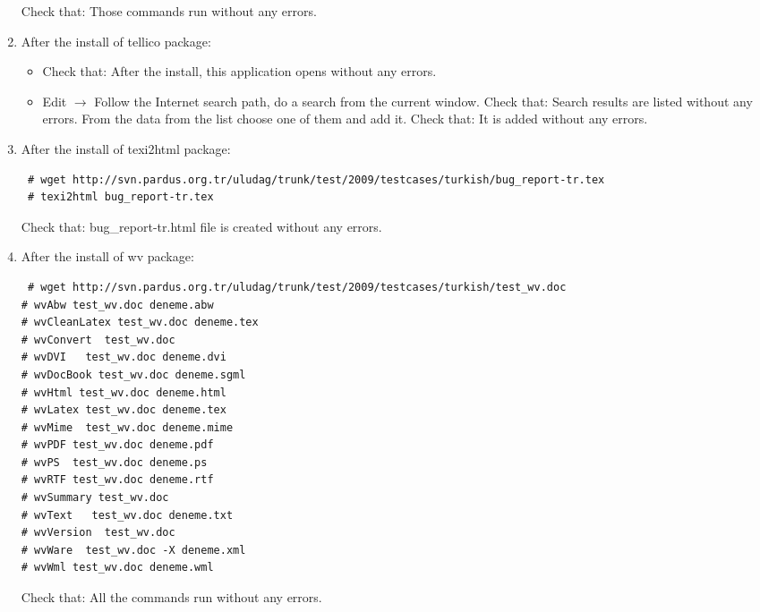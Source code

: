 \documentclass[a4paper,10pt]{article}
\begin{document}
\begin{enumerate}
Check that: Those commands run without any errors. 
\item After the install of tellico package:


\begin{itemize}
 \item Check that: After the install, this application opens without any errors.
 \item Edit $\rightarrow$ Follow the Internet search path, do a search from the current window. Check that: Search results are listed without any errors. From the data from the list choose one of them and add it. Check that: It is added without any errors.
\end{itemize}

\item After the install of  texi2html package:
\begin{verbatim}
 # wget http://svn.pardus.org.tr/uludag/trunk/test/2009/testcases/turkish/bug_report-tr.tex
 # texi2html bug_report-tr.tex
\end{verbatim}

Check that: bug\_report-tr.html file is created without any errors.

\item After the install of wv package:
\begin{verbatim}
 # wget http://svn.pardus.org.tr/uludag/trunk/test/2009/testcases/turkish/test_wv.doc
# wvAbw test_wv.doc deneme.abw                                
# wvCleanLatex test_wv.doc deneme.tex                            
# wvConvert  test_wv.doc                              
# wvDVI   test_wv.doc deneme.dvi                                
# wvDocBook test_wv.doc deneme.sgml                               
# wvHtml test_wv.doc deneme.html                                 
# wvLatex test_wv.doc deneme.tex                                
# wvMime  test_wv.doc deneme.mime                                
# wvPDF test_wv.doc deneme.pdf                                  
# wvPS  test_wv.doc deneme.ps                                  
# wvRTF test_wv.doc deneme.rtf                                  
# wvSummary test_wv.doc            
# wvText   test_wv.doc deneme.txt                               
# wvVersion  test_wv.doc                             
# wvWare  test_wv.doc -X deneme.xml                                
# wvWml test_wv.doc deneme.wml       

\end{verbatim}

Check that: All the commands run without any errors.


\end{enumerate}
\end{document}
